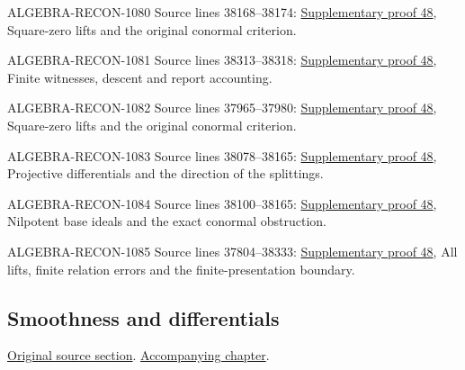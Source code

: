 \begin{AlgebraSourceRoutes}
\item[ALGEBRA-RECON-1080] Source lines 38168--38174: \hyperlink{algebra_formal_smooth_notes_20260928}{Supplementary proof 48}, Square-zero lifts and the original conormal criterion.
\item[ALGEBRA-RECON-1081] Source lines 38313--38318: \hyperlink{algebra_formal_smooth_notes_20260928}{Supplementary proof 48}, Finite witnesses, descent and report accounting.
\item[ALGEBRA-RECON-1082] Source lines 37965--37980: \hyperlink{algebra_formal_smooth_notes_20260928}{Supplementary proof 48}, Square-zero lifts and the original conormal criterion.
\item[ALGEBRA-RECON-1083] Source lines 38078--38165: \hyperlink{algebra_formal_smooth_notes_20260928}{Supplementary proof 48}, Projective differentials and the direction of the splittings.
\item[ALGEBRA-RECON-1084] Source lines 38100--38165: \hyperlink{algebra_formal_smooth_notes_20260928}{Supplementary proof 48}, Nilpotent base ideals and the exact conormal obstruction.
\item[ALGEBRA-RECON-1085] Source lines 37804--38333: \hyperlink{algebra_formal_smooth_notes_20260928}{Supplementary proof 48}, All lifts, finite relation errors and the finite-presentation boundary.
\end{AlgebraSourceRoutes}

\subsection{Smoothness and differentials}
\hypertarget{algebra-source-section-smooth-differential}{}
\noindent\href{https://github.com/stacks/stacks-project/blob/a04446e57ec1fbc252a871afcec7752fb2807b14/algebra.tex\#L38340}{Original source section}. \href{algebra.pdf\#nameddest=section-smooth-differential}{Accompanying chapter}.

